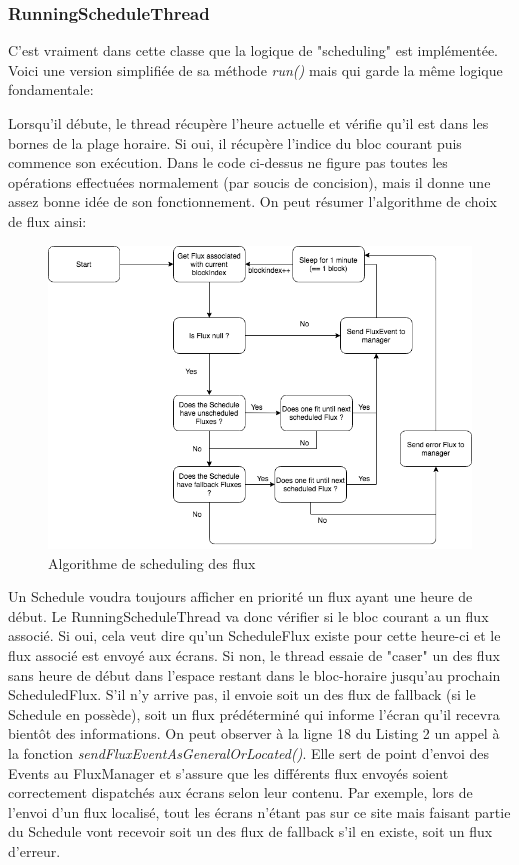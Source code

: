 \documentclass[french]{article}
\begin{document}
 
\subsubsection{RunningScheduleThread}
C'est vraiment dans cette classe que la logique de "scheduling" est implémentée. Voici une version simplifiée de sa méthode \textit{run()} mais qui garde la même logique fondamentale:



Lorsqu'il débute, le thread récupère l'heure actuelle et vérifie qu'il est dans les bornes de la plage horaire. Si oui, il récupère l'indice du bloc courant puis commence son exécution. Dans le code ci-dessus ne figure pas toutes les opérations effectuées normalement (par soucis de concision), mais il donne une assez bonne idée de son fonctionnement. 
\newpage
On peut résumer l'algorithme de choix de flux ainsi:

\begin{figure}[h]
	\centering	
	\includegraphics[width=0.8\linewidth]{schemas/runningschedulethread_algo.png}%
	\caption{Algorithme de scheduling des flux}
\end{figure}

Un Schedule voudra toujours afficher en priorité un flux ayant une heure de début. Le RunningScheduleThread va donc vérifier si le bloc courant a un flux associé. Si oui, cela veut dire qu'un ScheduleFlux existe pour cette heure-ci et le flux associé est envoyé aux écrans. Si non, le thread essaie de "caser" un des flux sans heure de début dans l'espace restant dans le bloc-horaire jusqu'au prochain ScheduledFlux. S'il n'y arrive pas, il envoie soit un des flux de fallback (si le Schedule en possède), soit un flux prédéterminé qui informe l'écran qu'il recevra bientôt des informations.\newline
On peut observer à la ligne 18 du Listing 2 un appel à la fonction \textit{sendFluxEventAsGeneralOrLocated()}. Elle sert de point d'envoi des Events au FluxManager et s'assure que les différents flux envoyés soient correctement dispatchés aux écrans selon leur contenu. Par exemple, lors de l'envoi d'un flux localisé, tout les écrans n'étant pas sur ce site mais faisant partie du Schedule vont recevoir soit un des flux de fallback s'il en existe, soit un flux d'erreur.
\end{document}
